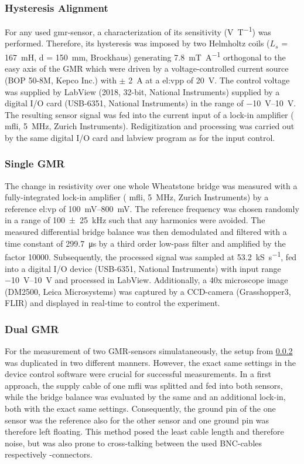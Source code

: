 \subsubsection{Hysteresis Alignment}
For any used \gls{gmr}-sensor, a characterization of its sensitivity (\si{\volt\per\tesla})  was performed. Therefore, its hysteresis was imposed by two Helmholtz coils ($L_s$ = \SI{167}{\milli\henry}, d = \SI{150}{\milli\meter}, Brockhaus) generating \SI{7.8}{\milli\tesla\per\ampere} orthogonal to the easy axis of the GMR which were driven by a voltage-controlled current source (BOP 50-8M, Kepco Inc.) with $\pm$ \SI{2}{\ampere} at a \gls{el:vpp} of \SI{20}{\volt}. The control voltage was supplied by LabView (2018, 32-bit, National Instruments) supplied by a digital I/O card (USB-6351, National Instruments) in the range of \SIrange{-10}{10}{\volt}.
The resulting sensor signal was fed into the current input of a lock-in amplifier ( \gls{mfli}, \SI{5}{\mega\hertz}, Zurich Instruments). %
Redigitization and processing was carried out by the same digital I/O card and labview program as for the input control.
\subsubsection{Single GMR} \label{sec:meth:singleGMR}
The change in resistivity over one whole Wheatstone bridge was measured with a fully-integrated lock-in amplifier ( \gls{mfli}, \SI{5}{\mega\hertz}, Zurich Instruments) by a reference \gls{el:vp} of \SIrange{100}{800}{\milli\volt}. The reference frequency was chosen randomly in a range of \SI{100(25)}{\kHz} such that any harmonics were avoided. The measured differential bridge balance was then demodulated and filtered with a time constant of \SI{299.7}{\micro\second} by a third order low-pass filter and amplified by the factor \num{10000}. Subsequently, the processed signal was sampled at \SI{53.2}{\kilo\siemens\per\second}, fed into a digital I/O device (USB-6351, National Instruments) with input range \SIrange{-10}{10}{\volt} and processed in LabView.\newline
Additionally, a 40x microscope image (DM2500, Leica Microsystems) was captured by a CCD-camera (Grasshopper3, FLIR) and displayed in real-time to control the experiment.
\subsubsection{Dual GMR}
\label{sec:meth:dualGMR}
For the measurement of two GMR-sensors simulataneously, the setup from \ref{sec:meth:singleGMR} was duplicated in two different manners. However, the exact same settings in the device control software were crucial for successful measurements.  In a first approach, the supply cable of one \gls{mfli} was splitted and fed into both sensors, while the bridge balance was evaluated by the same and an additional lock-in, both with the exact same settings. Consequently, the ground pin of the one sensor was the reference also for the other sensor and one ground pin was therefore left floating. This method posed the least cable length and therefore noise, but was also prone to cross-talking between the used BNC-cables respectively -connectors. 

